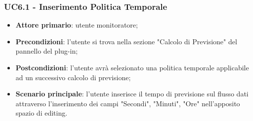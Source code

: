 	
	\label{par:UC6.1}
	\subsubsection{UC6.1 - Inserimento Politica Temporale}
		\begin{itemize}
			\item\textbf{Attore primario}: utente monitoratore;
			\item\textbf{Precondizioni}: l'utente si trova nella sezione "Calcolo di Previsione" del pannello del plug-in;
			\item\textbf{Postcondizioni}: l’utente avrà selezionato una politica temporale applicabile ad un successivo calcolo di previsione;
			\item\textbf{Scenario principale}: l’utente inserisce il tempo di previsione sul flusso dati attraverso l'inserimento dei campi "Secondi", "Minuti", "Ore" nell’apposito spazio di editing.
		\end{itemize}	

	\label{par:UC6.2}
